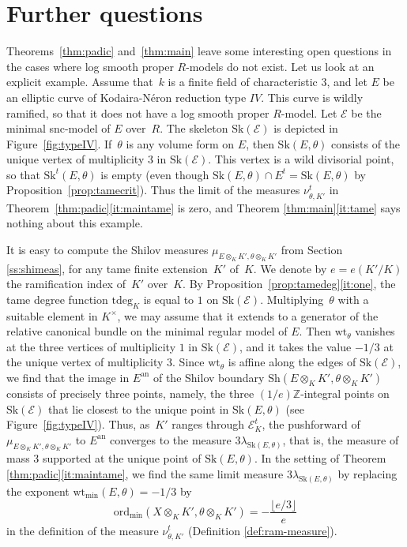 \documentclass[11pt]{article}
\let\mathcal\mathscr
\theoremstyle{definition}
\numberwithin{equation}{subsection}
\newcommand{\Z}{\ensuremath{\mathbb{Z}}}
\newcommand{\cE}{\ensuremath{\mathscr{E}}}
\newcommand{\an}{\mathrm{an}}
\newcommand{\ord}{\mathrm{ord}}
\newcommand{\Sh}{\mathrm{Sh}}
\newcommand{\Sk}{\mathrm{Sk}}
\newcommand{\tdeg}{\mathrm{tdeg}}
\newcommand{\wt}{\mathrm{wt}}
\let\form\theta
\let\Leb\lambda
\begin{document}
\section{Further questions}
Theorems~\ref{thm:padic} and~\ref{thm:main} leave some interesting open questions in the cases where log smooth proper $R$\nobreakdash-models do not exist. Let us look at an explicit example.
Assume that~$k$ is a finite field of characteristic $3$, and let $E$ be an elliptic curve of Kodaira-Néron reduction type $IV$.
This curve is wildly ramified, so that it does not have a log smooth proper $R$\nobreakdash-model. Let $\cE$ be the minimal snc-model of $E$ over~$R$. The skeleton $\Sk(\cE)$ is depicted in Figure~\ref{fig:typeIV}. If~$\form$ is any volume form on $E$, then $\Sk(E,\form)$ consists of the unique vertex of multiplicity $3$ in $\Sk(\cE)$. This vertex is a wild divisorial point, so that $\Sk^t(E,\form)$ is empty (even though $\Sk(E,\form)\cap E^t=\Sk(E,\form)$ by Proposition~\ref{prop:tamecrit}). Thus the limit of the measures $\nu^t_{\form, K'}$ in Theorem~\ref{thm:padic}\eqref{it:maintame} is zero, and Theorem \ref{thm:main}\eqref{it:tame} says nothing about this example.

It is easy to compute the Shilov measures $\mu_{E\otimes_K K',\form\otimes_K K'}$ from Section \ref{ss:shimeas}, for any tame finite extension~$K'$ of~$K$. We denote by $e=e(K'/K)$ the ramification index of~$K'$ over~$K$. By Proposition~\ref{prop:tamedeg}\eqref{it:one}, the tame degree function $\tdeg_K$ is equal to $1$ on $\Sk(\cE)$.
Multiplying~$\form$ with a suitable element in $K^{\times}$, we may assume that it extends to a generator of the relative canonical bundle on the minimal regular model of $E$.
Then $\wt_{\form}$ vanishes at the three vertices of multiplicity $1$ in $\Sk(\cE)$, and it takes the value $-1/3$ at the unique vertex of multiplicity $3$. Since $\wt_{\form}$ is affine along the edges of $\Sk(\cE)$, we find that the image in $E^{\an}$ of the Shilov boundary $\Sh(E\otimes_K K',\form\otimes_K K')$ consists of precisely three points, namely, the three $(1/e)\Z$-integral points on $\Sk(\cE)$ that lie closest to the unique point in $\Sk(E,\form)$ (see Figure~\ref{fig:typeIV}).
Thus, as~$K'$ ranges through $\mathcal{E}^t_K$, the pushforward of $\mu_{E\otimes_K K',\form\otimes_K K'}$ to $E^{\an}$ converges to the measure $3\Leb_{\Sk(E,\form)}$, that is, the measure of mass $3$ supported at the unique point of $\Sk(E,\form)$.
In the setting of Theorem \ref{thm:padic}\eqref{it:maintame}, we find the same limit measure $3\Leb_{\Sk(E,\form)}$ by
replacing the exponent $\wt_{\min}(E,\form)=-1/3$ by\vspace*{-3pt}\enlargethispage{\baselineskip}%
\[
\ord_{\min}(X\otimes_K K',\form\otimes_K K')=-\frac{\lfloor e/3 \rfloor}{e}
\]
in the definition of the measure $\nu^t_{\form,K'}$ (Definition \ref{def:ram-measure}).
\end{document}
